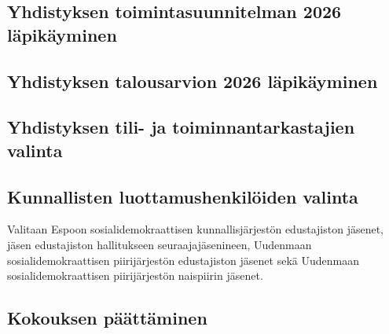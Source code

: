 \documentclass[a4paper,12pt]{article}
\begin{document}
\subsection{Yhdistyksen toimintasuunnitelman 2026 läpikäyminen}
\subsection{Yhdistyksen talousarvion 2026 läpikäyminen}
\subsection{Yhdistyksen tili- ja toiminnantarkastajien valinta}
\subsection{Kunnallisten luottamushenkilöiden valinta}
Valitaan Espoon sosialidemokraattisen kunnallisjärjestön edustajiston jäsenet, jäsen edustajiston hallitukseen seuraajajäsenineen, Uudenmaan sosialidemokraattisen piirijärjestön edustajiston jäsenet sekä Uudenmaan sosialidemokraattisen piirijärjestön naispiirin jäsenet.
\subsection{Kokouksen päättäminen}
\end{document}
